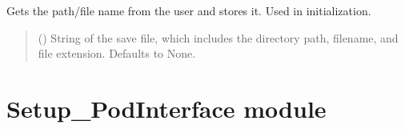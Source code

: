 \documentclass[letterpaper,10pt,english]{sphinxmanual}
\begin{document}
\begin{fulllineitems}
\begin{fulllineitems}
\begin{quote}
\begin{description}
\end{description}\end{quote}

\end{fulllineitems}


\begin{fulllineitems}
\label{\detokenize{Setup_PodDevices:Setup_PodDevices.Setup_PodDevices.SetupSaveFile}}
\pysigstartsignatures
{}
\pysigstopsignatures
\sphinxAtStartPar
Gets the path/file name from the user and stores it. Used in initialization.
\begin{quote}\begin{description}
\sphinxAtStartPar
{} (\sphinxstyleliteralemphasis{\sphinxupquote{ | }}\sphinxstyleliteralemphasis{\sphinxupquote{, }}) \textendash{} String of the save file, which includes the directory path,                 filename, and file extension. Defaults to None.

\end{description}\end{quote}

\end{fulllineitems}


\end{fulllineitems}


\sphinxstepscope


\section{Setup\_PodInterface module}
\label{\detokenize{Setup_PodInterface:module-Setup_PodInterface}}\label{\detokenize{Setup_PodInterface:setup-podinterface-module}}\label{\detokenize{Setup_PodInterface::doc}}
\end{document}
